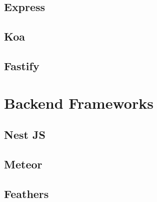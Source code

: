 \subsection{Express}

\subsection{Koa}

\subsection{Fastify}


\section{Backend Frameworks}

\subsection{Nest JS}

\subsection{Meteor}

\subsection{Feathers}

